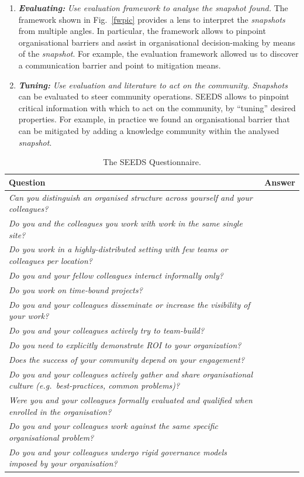 \begin{enumerate}
\item \emph{\bf Evaluating:} \emph{Use evaluation framework to analyse the \emph{snapshot} found.}
The framework shown in Fig.~\ref{fwpic} provides a lens to interpret the \emph{\emph{snapshots}} from multiple angles. In particular, the framework allows to pinpoint organisational barriers and assist in organisational decision-making by means of the \emph{snapshot}. For example, the evaluation framework allowed us to discover a communication barrier and point to mitigation means.

\item \emph{\bf Tuning:} \emph{Use evaluation and literature \cite{ossslr} to act on the community.}
\emph{\emph{Snapshots}} can be evaluated to steer community operations. SEEDS allows to pinpoint critical information with which to act on the community, by ``tuning'' desired properties. For example, in practice we found an organisational barrier that can be mitigated by adding a knowledge community within the analysed \emph{snapshot}.

\end{enumerate}
\begin{table}
\hspace{1cm}

\begin{tabular}{|>{\raggedright}p{11cm}|>{\raggedright}p{1.5cm}|}
\hline 
\textbf{Question} & \textbf{Answer}\tabularnewline
\hline 
\emph{Can you distinguish an organised structure across yourself and
your colleagues?} & \tabularnewline
\hline 
\emph{Do you and the colleagues you work with work in the same single
site?} & \tabularnewline
\hline 
\emph{Do you work in a highly-distributed setting with few teams or
colleagues per location?} & \tabularnewline
\hline 
\emph{Do you and your fellow colleagues interact informally only?} & \tabularnewline
\hline 
\emph{Do you work on time-bound projects?} & \tabularnewline
\hline 
\emph{Do you and your colleagues disseminate or increase the visibility
of your work? } & \tabularnewline
\hline 
\emph{Do you and your colleagues actively try to team-build? } & \tabularnewline
\hline 
\emph{Do you need to explicitly demonstrate ROI to your organization? } & \tabularnewline
\hline 
\emph{Does the success of your community depend on your engagement? } & \tabularnewline
\hline 
\emph{Do you and your colleagues actively gather and share organisational
culture (e.g.~best-practices, common problems)?} & \tabularnewline
\hline 
\emph{Were you and your colleagues formally evaluated and qualified
when enrolled in the organisation? } & \tabularnewline
\hline 
\emph{Do you and your colleagues work against the same specific organisational
problem? } & \tabularnewline
\hline 
\emph{Do you and your colleagues undergo rigid governance models imposed
by your organisation? } & \tabularnewline
\hline 
\end{tabular}
\caption{The SEEDS Questionnaire.}\label{question}
\end{table}


